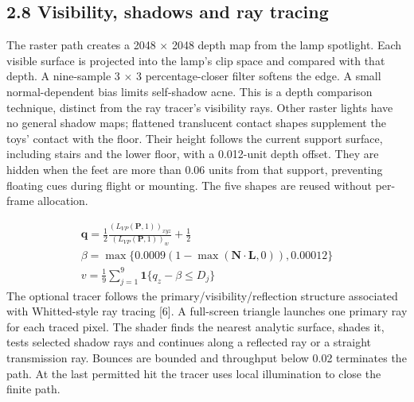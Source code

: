 \documentclass[12pt,a4paper]{article}
\begin{document}
\subsection*{2.8 Visibility, shadows and ray tracing}
The raster path creates a 2048 \(\times\) 2048 depth map from the lamp spotlight. Each visible surface is projected into the lamp's clip space and compared with that depth. A nine-sample 3 \(\times\) 3 percentage-closer filter softens the edge. A small normal-dependent bias limits self-shadow acne. This is a depth comparison technique, distinct from the ray tracer's visibility rays. Other raster lights have no general shadow maps; flattened translucent contact shapes supplement the toys' contact with the floor. Their height follows the current support surface, including stairs and the lower floor, with a 0.012-unit depth offset. They are hidden when the feet are more than 0.06 units from that support, preventing floating cues during flight or mounting. The five shapes are reused without per-frame allocation.

{\small\begin{equation}\begin{gathered}
\mathbf q=\tfrac12\frac{(L_{VP}(\mathbf P,1))_{xyz}}{(L_{VP}(\mathbf P,1))_w}+\tfrac12\\
\beta=\max\{0.0009(1-\max(\mathbf N\cdot\mathbf L,0)),0.00012\}\\
v=\frac19\sum_{j=1}^{9}\mathbf 1\{q_z-\beta\le D_j\}
\end{gathered}\label{eq:14}\end{equation}}
The optional tracer follows the primary/visibility/reflection structure associated with Whitted-style ray tracing [6]. A full-screen triangle launches one primary ray for each traced pixel. The shader finds the nearest analytic surface, shades it, tests selected shadow rays and continues along a reflected ray or a straight transmission ray. Bounces are bounded and throughput below 0.02 terminates the path. At the last permitted hit the tracer uses local illumination to close the finite path.
\end{document}
